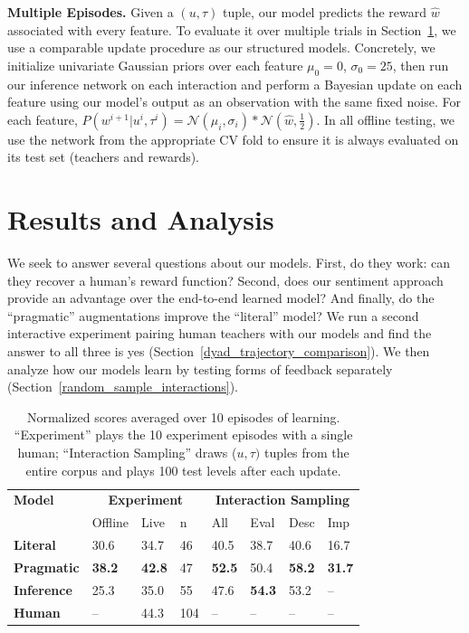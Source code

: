 \documentclass[letterpaper]{article} %
\begin{document}
\textbf{Multiple Episodes.} Given a $(u, \tau)$ tuple, our model predicts the reward $\hat{w}$ associated with every feature. To evaluate it over multiple trials in Section~\ref{results_and_analysis_section}, we use a comparable update procedure as our structured models. Concretely, we initialize univariate Gaussian priors over each feature $\mu_0 = 0$, $\sigma_0 = 25$, then run our inference network on each interaction and perform a Bayesian update on each feature using our model's output as an observation with the same fixed noise. For each feature, $P(w^{i+1} | u^i, \tau^i) = \mathcal{N}(\mu_{i},\sigma_{i}) * \mathcal{N}(\hat{w}, \frac{1}{2})$. In all offline testing, we use the network from the appropriate CV fold to ensure it is always evaluated on its test set (teachers and rewards).

\section{Results and Analysis}
\label{results_and_analysis_section}
We seek to answer several questions about our models. First, do they work: can they recover a human's reward function? Second, does our sentiment approach provide an advantage over the end-to-end learned model? And finally, do the ``pragmatic'' augmentations improve the ``literal'' model? We run a second interactive experiment pairing human teachers with our models and find the answer to all three is yes (Section~\ref{dyad_trajectory_comparison}). We then analyze how our models learn by testing forms of feedback separately (Section~\ref{random_sample_interactions}).

\tabcolsep=1.2mm
\begin{table}[t]
\begin{center}
\begin{tabular}{l|lll|llll}
\textbf{Model}     & \multicolumn{3}{c|}{\textbf{Experiment}} & \multicolumn{4}{c}{\textbf{Interaction Sampling}} \\
& Offline  & Live  & n      &All            &Eval     &Desc        &Imp\\ \hline
\textbf{Literal}        &  30.6     & 34.7      & 46           & 40.5           & 38.7          & 40.6              & 16.7          \\
\textbf{Pragmatic}      & \textbf{38.2}      & \textbf{42.8}      & 47               & \textbf{52.5} & 50.4          & \textbf{58.2}   & \textbf{31.7}\\
\textbf{Inference}  & 25.3      & 35.0     & 55               & 47.6            & \textbf{54.3} & 53.2              & --         \\
\textbf{Human}          & --        & 44.3      & 104         & --                &--             &--             &--
\end{tabular}
\caption{Normalized scores averaged over 10 episodes of learning. ``Experiment'' plays the 10 experiment episodes with a single human; ``Interaction Sampling'' draws ($u,\tau)$ tuples from the entire corpus and plays 100 test levels after each update.}
\label{tab:pragmatics_and_utterance_type_table}
\end{center}
\end{table}
\end{document}
